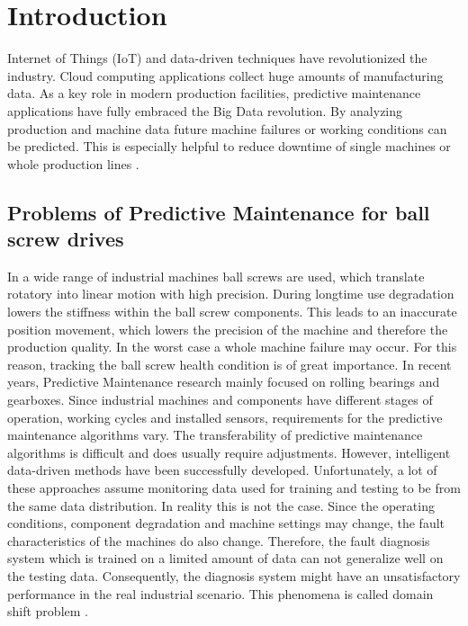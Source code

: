
\chapter{Introduction}\label{chapter:introduction}
Internet of Things (IoT) and data-driven techniques have revolutionized the industry. Cloud computing applications collect huge amounts of manufacturing data. As a key role in modern production facilities, predictive maintenance applications have fully embraced the Big Data revolution. By analyzing production and machine data future machine failures or working conditions can be predicted. This is especially helpful to reduce downtime of single machines or whole production lines \cite{ZHAO2019213}. 

\section{Problems of Predictive Maintenance for ball screw drives}
In a wide range of industrial machines ball screws are used, which translate rotatory into linear motion with high precision. During longtime use degradation lowers the stiffness within the ball screw components. This leads to an inaccurate position movement, which lowers the precision of the machine and therefore the production quality. In the worst case a whole machine failure may occur. For this reason, tracking the ball screw health condition is of great importance. In recent years, Predictive Maintenance research mainly focused on rolling bearings and gearboxes. Since industrial machines and components have different stages of operation, working cycles and installed sensors, requirements for the predictive maintenance algorithms vary. The transferability of predictive maintenance algorithms is difficult and does usually require adjustments. However, intelligent data-driven methods have been successfully developed. Unfortunately, a lot of these approaches assume monitoring data used for training and testing to be from the same data distribution. In reality this is not the case. Since the operating conditions, component degradation and machine settings may change, the fault characteristics of the machines do also change. Therefore, the fault diagnosis system which is trained on a limited amount of data can not generalize well on the testing data. Consequently, the diagnosis system might have an unsatisfactory performance in the real industrial scenario. This phenomena is called domain shift problem \cite{AZAMFAR2020103932}. 

